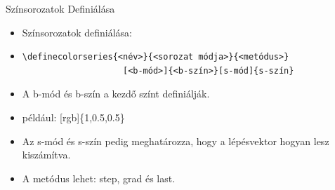 \documentclass[aspectratio=1610, dvipsnames, xcolor=table]{beamer}
\begin{document}
    
    \begin{frame}[fragile]{Színsorozatok Definiálása}
        \begin{itemize}
            \item Színsorozatok definiálása: 
            \item \begin{verbatim}\definecolorseries{<név>}{<sorozat módja>}{<metódus>}
                    [<b-mód>]{<b-szín>}[s-mód]{s-szín}\end{verbatim}
            \item A b-mód és b-szín a kezdő színt definiálják.
            \item például: [rgb]\{1,0.5,0.5\}
            \item Az s-mód és s-szín pedig meghatározza, hogy a lépésvektor hogyan lesz kiszámítva.
            \item A metódus lehet: step, grad és last.
        \end{itemize}
    \end{frame}
\end{document}
